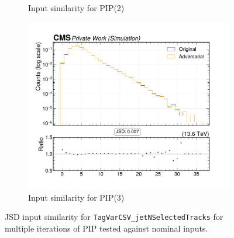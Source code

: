 \begin{figure}[htbp]
\begin{subfigure}[t]{0.32\textwidth}
    \caption{Input similarity for PIP(2)}
  \end{subfigure}\hfill
  \begin{subfigure}[t]{0.32\textwidth}
    \includegraphics[width=\linewidth]{media/output/features/compare/intprob_3/cmp_global_features_TagVarCSV_jetNSelectedTracks.pdf}
    \caption{Input similarity for PIP(3)}
  \end{subfigure}

  \caption{JSD input similarity for \texttt{TagVarCSV\_jetNSelectedTracks} for multiple iterations of PIP tested against nominal inputs.}
  \label{fig:intprob_input_TagVarCSV_jetNSelectedTracks}
\end{figure}

